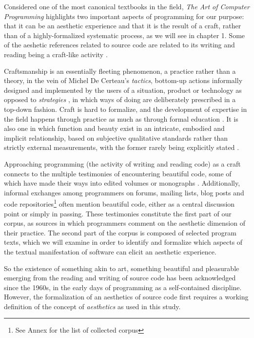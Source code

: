 Considered one of the most canonical textbooks in the field, \emph{The Art of Computer Programming} highlights two important aspects of programming for our purpose: that it can be an aesthetic experience and that it is the result of a craft, rather than of a highly-formalized systematic process, as we will see in chapter 1. Some of the aeshetic references related to source code are related to its writing and reading being a craft-like activity \citep{dijkstra_craftsman_1982}.

Craftsmanship is an essentially fleeting phenomenon, a practice rather than a theory, in the vein of Michel De Certeau's \textit{tactics}, bottom-up actions informally designed and implemented by the users of a situation, product or technology as opposed to \textit{strategies} \citep{certeau_invention_1990}, in which ways of doing are deliberately prescribed in a top-down fashion. Craft is hard to formalize, and the development of expertise in the field happens through practice as much as through formal education \citep{sennett_craftsman_2009}. It is also one in which function and beauty exist in an intricate, embodied and implicit relationship, based on subjective qualitative standards rather than strictly external measurements, with the former rarely being explicitly stated \citep{pye_nature_2008}.

Approaching programming (the activity of writing and reading code) as a craft \citep{levy_programmation_1992} connects to the multiple testimonies of encountering beautiful code, some of which have made their ways into edited volumes or monographs \citep{oram_beautiful_2007,chandra_geek_2014,gabriel_patterns_1998}. Additionally, informal exchanges among programmers on forums, mailing lists, blog posts and code repositories\footnote{See Annex for the list of collected corpus} often mention beautiful code, either as a central discussion point or simply in passing. These testimonies constitute the first part of our corpus, as sources in which programmers comment on the aesthetic dimension of their practice. The second part of the corpus is composed of selected program texts, which we will examine in order to identify and formalize which aspects of the textual manifestation of software can elicit an aesthetic experience.

So the existence of something akin to art, something beautiful and pleasurable emerging from the reading and writing of source code has been acknowledged since the 1960s, in the early days of programming as a self-contained discipline. However, the formalization of an aesthetics of source code first requires a working definition of the concept of \emph{aesthetics} as used in this study.

